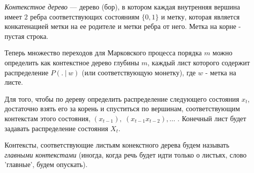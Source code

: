 \documentclass{matmex-diploma-custom}
\begin{document}
\textit{Контекстное дерево} --- дерево (бор), в котором каждая внутренняя вершина имеет $ 2 $ ребра соответствующих состояниям $\{0,1\}$ и метку, которая является конкатенацией метки на ее родителе и метки ребра от него. Метка на корне - пустая строка. 

Теперь множество переходов для Марковского процесса порядка $ m $ можно определить как контекстное дерево глубины $ m $, каждый лист которого содержит распределение $P(.~|~w)$ (или соответствующую монетку), где $ w $ - метка на листе.

Для того, чтобы по дереву определить распределение следующего состояния $ x_{t} $, достаточно взять его за корень и спуститься по вершинам, соответствующим контекстам этого состояния, $(x_{t-1}),\; (x_{t-1}x_{t-2}), \ldots$ . Конечный лист будет задавать распределение состояния $ X_{t} $.

Контексты, соответствующие листьям конекстного дерева будем называть \textit{главными контекстами} (иногда, когда речь будет идти только о листьях, слово 'главные', будем опускать).
\end{document}
